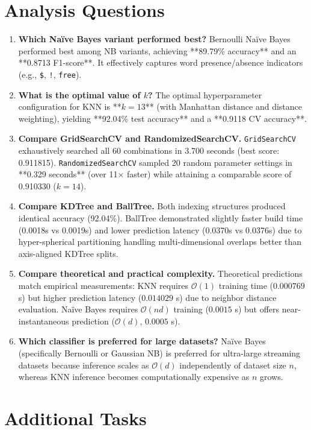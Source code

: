 \documentclass[12pt,a4paper]{article}
\begin{document}
\section{Analysis Questions}
\begin{enumerate}
    \item \textbf{Which Na\"ive Bayes variant performed best?}
    Bernoulli Na\"ive Bayes performed best among NB variants, achieving **89.79\% accuracy** and an **0.8713 F1-score**. It effectively captures word presence/absence indicators (e.g., \texttt{\$}, \texttt{!}, \texttt{free}).
    \item \textbf{What is the optimal value of $k$?}
    The optimal hyperparameter configuration for KNN is **$k=13$** (with Manhattan distance and distance weighting), yielding **92.04\% test accuracy** and a **0.9118 CV accuracy**.
    \item \textbf{Compare GridSearchCV and RandomizedSearchCV.}
    \texttt{GridSearchCV} exhaustively searched all 60 combinations in 3.700 seconds (best score: 0.911815). \texttt{RandomizedSearchCV} sampled 20 random parameter settings in **0.329 seconds** (over 11$\times$ faster) while attaining a comparable score of 0.910330 ($k=14$).
    \item \textbf{Compare KDTree and BallTree.}
    Both indexing structures produced identical accuracy (92.04\%). BallTree demonstrated slightly faster build time (0.0018s vs 0.0019s) and lower prediction latency (0.0370s vs 0.0376s) due to hyper-spherical partitioning handling multi-dimensional overlaps better than axis-aligned KDTree splits.
    \item \textbf{Compare theoretical and practical complexity.}
    Theoretical predictions match empirical measurements: KNN requires $\mathcal{O}(1)$ training time ($0.000769$ s) but higher prediction latency ($0.014029$ s) due to neighbor distance evaluation. Na\"ive Bayes requires $\mathcal{O}(nd)$ training ($0.0015$ s) but offers near-instantaneous prediction ($\mathcal{O}(d)$, $0.0005$ s).
    \item \textbf{Which classifier is preferred for large datasets?}
    Na\"ive Bayes (specifically Bernoulli or Gaussian NB) is preferred for ultra-large streaming datasets because inference scales as $\mathcal{O}(d)$ independently of dataset size $n$, whereas KNN inference becomes computationally expensive as $n$ grows.
\end{enumerate}

\section{Additional Tasks}
\end{document}
